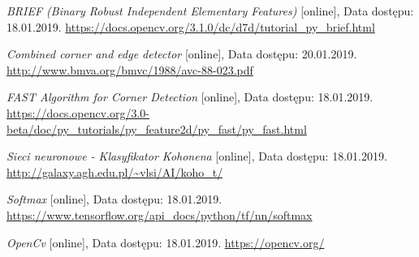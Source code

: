 \documentclass[12pt, notitlepage]{article}
\begin{document}
\newpage

\begin{thebibliography}{9}

\textit{BRIEF (Binary Robust Independent Elementary Features) } [online], Data dostępu: 18.01.2019. 
\newline\url{https://docs.opencv.org/3.1.0/dc/d7d/tutorial_py_brief.html}

\textit{Combined corner and edge detector } [online], Data dostępu: 20.01.2019. 
\newline\url{http://www.bmva.org/bmvc/1988/avc-88-023.pdf}

\textit{FAST Algorithm for Corner Detection} [online], Data dostępu: 18.01.2019. 
\newline\url{https://docs.opencv.org/3.0-beta/doc/py_tutorials/py_feature2d/py_fast/py_fast.html}

\textit{Sieci neuronowe - Klasyfikator Kohonena} [online], Data dostępu: 18.01.2019. 
\newline\url{http://galaxy.agh.edu.pl/~vlsi/AI/koho_t/}

\textit{Softmax} [online], Data dostępu: 18.01.2019. 
\newline\url{https://www.tensorflow.org/api_docs/python/tf/nn/softmax}

\textit{OpenCv} [online], Data dostępu: 18.01.2019. 
\newline\url{https://opencv.org/}

\end{thebibliography} 





\end{document}
